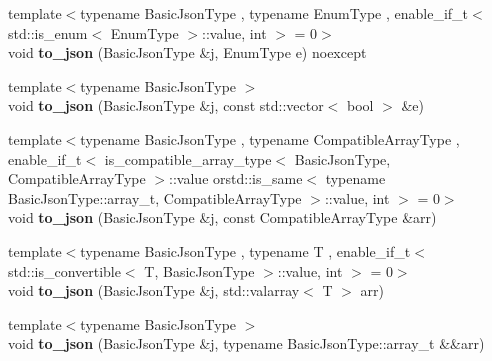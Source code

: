 \begin{DoxyCompactItemize}
\item 
{\footnotesize template$<$typename Basic\+Json\+Type , typename Enum\+Type , enable\+\_\+if\+\_\+t$<$ std\+::is\+\_\+enum$<$ Enum\+Type $>$\+::value, int $>$  = 0$>$ }\\void {\bfseries to\+\_\+json} (Basic\+Json\+Type \&j, Enum\+Type e) noexcept\hypertarget{namespacenlohmann_1_1detail_a0c8b159dba71981d6c555d284cf6e2bf}{}\label{namespacenlohmann_1_1detail_a0c8b159dba71981d6c555d284cf6e2bf}

\item 
{\footnotesize template$<$typename Basic\+Json\+Type $>$ }\\void {\bfseries to\+\_\+json} (Basic\+Json\+Type \&j, const std\+::vector$<$ bool $>$ \&e)\hypertarget{namespacenlohmann_1_1detail_aeca6fb5fede5ed1e12a4420d98a5692b}{}\label{namespacenlohmann_1_1detail_aeca6fb5fede5ed1e12a4420d98a5692b}

\item 
{\footnotesize template$<$typename Basic\+Json\+Type , typename Compatible\+Array\+Type , enable\+\_\+if\+\_\+t$<$ is\+\_\+compatible\+\_\+array\+\_\+type$<$ Basic\+Json\+Type, Compatible\+Array\+Type $>$\+::value orstd\+::is\+\_\+same$<$ typename Basic\+Json\+Type\+::array\+\_\+t, Compatible\+Array\+Type $>$\+::value, int $>$  = 0$>$ }\\void {\bfseries to\+\_\+json} (Basic\+Json\+Type \&j, const Compatible\+Array\+Type \&arr)\hypertarget{namespacenlohmann_1_1detail_a3afebc132c5ff83f9cd160e52030fdfd}{}\label{namespacenlohmann_1_1detail_a3afebc132c5ff83f9cd160e52030fdfd}

\item 
{\footnotesize template$<$typename Basic\+Json\+Type , typename T , enable\+\_\+if\+\_\+t$<$ std\+::is\+\_\+convertible$<$ T, Basic\+Json\+Type $>$\+::value, int $>$  = 0$>$ }\\void {\bfseries to\+\_\+json} (Basic\+Json\+Type \&j, std\+::valarray$<$ T $>$ arr)\hypertarget{namespacenlohmann_1_1detail_afd18898316e9a20a6458877d2ee27d31}{}\label{namespacenlohmann_1_1detail_afd18898316e9a20a6458877d2ee27d31}

\item 
{\footnotesize template$<$typename Basic\+Json\+Type $>$ }\\void {\bfseries to\+\_\+json} (Basic\+Json\+Type \&j, typename Basic\+Json\+Type\+::array\+\_\+t \&\&arr)\hypertarget{namespacenlohmann_1_1detail_aa0fd1b5788e9ba37e31da43dda738cb5}{}\label{namespacenlohmann_1_1detail_aa0fd1b5788e9ba37e31da43dda738cb5}


\end{DoxyCompactItemize}
